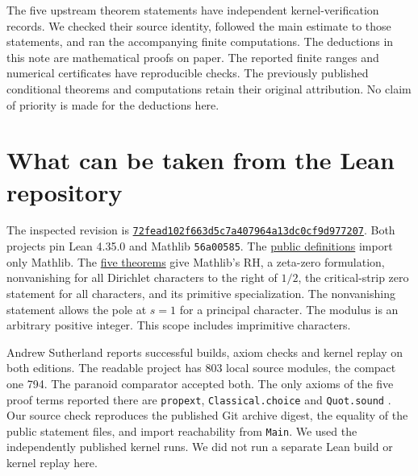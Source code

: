 \documentclass[11pt]{article}
\newcommand{\heading}[1]{\par\noindent{\large\bfseries\color{ink}#1}\par\smallskip}
\newcommand{\up}{https://github.com/lsernau/grh-lean/blob/72fead102f663d5c7a407964a13dc0cf9d977207/grh}
\newcommand{\gh}[2]{\href{\up/#1}{#2}}
\begin{document}
\heading{Evidence and scope}
The five upstream theorem statements have independent kernel-verification records. We checked their source identity, followed the main estimate to those statements, and ran the accompanying finite computations. The deductions in this note are mathematical proofs on paper. The reported finite ranges and numerical certificates have reproducible checks. The previously published conditional theorems and computations retain their original attribution. No claim of priority is made for the deductions here.

\newpage
\section{What can be taken from the Lean repository}
The inspected revision is \href{https://github.com/lsernau/grh-lean/tree/72fead102f663d5c7a407964a13dc0cf9d977207}{\texttt{72fead102f663d5c7a407964a13dc0cf9d977207}}. Both projects pin Lean 4.35.0 and Mathlib \texttt{56a00585}. The \gh{src/Statements.lean}{public definitions} import only Mathlib. The \gh{src/Main.lean}{five theorems} give Mathlib's RH, a zeta-zero formulation, nonvanishing for all Dirichlet characters to the right of $1/2$, the critical-strip zero statement for all characters, and its primitive specialization. The nonvanishing statement allows the pole at $s=1$ for a principal character. The modulus is an arbitrary positive integer. This scope includes imprimitive characters.

Andrew Sutherland reports successful builds, axiom checks and kernel replay on both editions. The readable project has 803 local source modules, the compact one 794. The paranoid comparator accepted both. The only axioms of the five proof terms reported there are \texttt{propext}, \texttt{Classical.choice} and \texttt{Quot.sound} \cite{mit}. Our source check reproduces the published Git archive digest, the equality of the public statement files, and import reachability from \texttt{Main}. We used the independently published kernel runs. We did not run a separate Lean build or kernel replay here.
\end{document}

